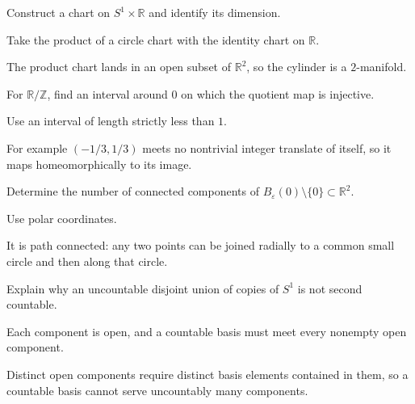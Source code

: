 \begin{exercise}\label{exr:vii01-ped-02}
Construct a chart on \(S^1\times\mathbb R\) and identify its dimension.
\end{exercise}
\begin{hint}
Take the product of a circle chart with the identity chart on \(\mathbb R\).
\end{hint}
\begin{solution}
The product chart lands in an open subset of \(\mathbb R^2\), so the cylinder is a \(2\)-manifold.
\end{solution}

\begin{exercise}\label{exr:vii01-ped-03}
For \(\mathbb R/\mathbb Z\), find an interval around \(0\) on which the quotient map is injective.
\end{exercise}
\begin{hint}
Use an interval of length strictly less than \(1\).
\end{hint}
\begin{solution}
For example \((-1/3,1/3)\) meets no nontrivial integer translate of itself, so it maps homeomorphically to its image.
\end{solution}

\begin{exercise}\label{exr:vii01-ped-04}
Determine the number of connected components of \(B_\varepsilon(0)\setminus\{0\}\subset\mathbb R^2\).
\end{exercise}
\begin{hint}
Use polar coordinates.
\end{hint}
\begin{solution}
It is path connected: any two points can be joined radially to a common small circle and then along that circle.
\end{solution}

\begin{exercise}\label{exr:vii01-ped-05}
Explain why an uncountable disjoint union of copies of \(S^1\) is not second countable.
\end{exercise}
\begin{hint}
Each component is open, and a countable basis must meet every nonempty open component.
\end{hint}
\begin{solution}
Distinct open components require distinct basis elements contained in them, so a countable basis cannot serve uncountably many components.
\end{solution}

